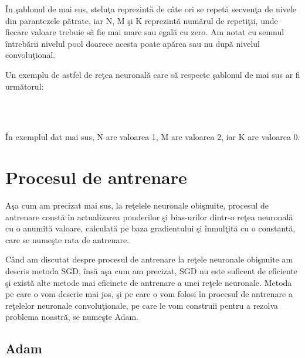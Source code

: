 \^{I}n \c{s}ablonul de mai sus, stelu\c{t}a reprezint\u{a} de c\^{a}te ori se repet\u{a} secven\c{t}a de nivele din parantezele p\u{a}trate, iar N, M \c{s}i K reprezint\u{a} num\u{a}rul de repeti\c{t}ii, unde fiecare valoare trebuie s\u{a} fie mai mare sau egal\u{a} cu zero. Am notat cu semnul \^{i}ntreb\u{a}rii nivelul pool doarece acesta poate ap\u{a}rea sau nu dup\u{a} nivelul convolu\c{t}ional.

\par

Un exemplu de astfel de re\c{t}ea neuronal\u{a} care s\u{a} respecte \c{s}ablonul de mai sus ar fi urm\u{a}torul:

 \longrightarrow {} \longrightarrow {} \longrightarrow {} \longrightarrow \\ 
\longrightarrow {} \longrightarrow {} \longrightarrow {} \longrightarrow \\ 
\longrightarrow  {} \longrightarrow {}

\^{I}n exemplul dat mai sus, N are valoarea 1, M are valoarea 2, iar K are valoarea 0.

\section{Procesul de antrenare}

A\c{s}a cum am precizat mai sus, la re\c{t}elele neuronale obi\c{s}nuite, procesul de antrenare const\u{a} \^{i}n actualizarea ponderilor \c{s}i bias-urilor dintr-o re\c{t}ea neuronal\u{a} cu o anumit\u{a} valoare, calculat\u{a} pe baza gradientului \c{s}i \^{i}nmul\c{t}it\u{a} cu o constant\u{a}, care se nume\c{s}te rata de antrenare.

C\^{a}nd am discutat despre procesul de antrenare la re\c{t}ele neuronale obi\c{s}nuite am descris metoda SGD, \^{i}ns\u{a} a\c{s}a cum am precizat, SGD nu este suficent de eficiente \c{s}i exist\u{a} alte metode mai eficinete de antrenare a unei re\c{t}ele neuronale. Metoda pe care o vom descrie mai jos, \c{s}i pe care o vom folosi \^{i}n procesul de antrenare a re\c{t}elelor neuronale convolu\c{t}ionale, pe care le vom construii pentru a rezolva problema noastr\u{a}, se nume\c{s}te Adam.

\subsection{Adam}

